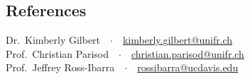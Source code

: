 \documentclass[margin,a4paper]{res}
\begin{document}
\begin{resume}

\section{References}

Dr.~Kimberly Gilbert\ \ $\cdotp$\ \ \href{mailto:kimberly.gilbert@unifr.ch}{kimberly.gilbert@unifr.ch}\\
Prof.~Christian Parisod\ \ $\cdotp$\ \ \href{mailto:christian.parisod@unifr.ch}{christian.parisod@unifr.ch}\\
Prof.~Jeffrey Ross-Ibarra\ \ $\cdotp$\ \ \href{mailto:rossibarra@ucdavis.edu}{rossibarra@ucdavis.edu}\\



\end{resume}
\end{document}
